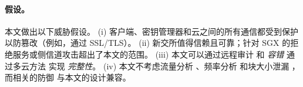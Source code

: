\paragraph*{假设。}
本文做出以下威胁假设。 (i) 客户端、密钥管理器和云之间的所有通信都受到保护以防篡改（例如，通过 SSL/TLS）。 (ii) 新交所值得信赖且可靠；针对 SGX \cite{bulck18, oleksenko18} 的拒绝服务或侧信道攻击超出了本文的范围。 (iii) 本文可以通过远程审计 \cite{ateniese2007provable, juels07} 和 \textit{ 容错} 通过多云方法 \cite{li15} 实现 \textit{ 完整性}。 (iv) 本文不考虑流量分析 \cite{zuo2018mitigating}、频率分析 \cite{li20b} 和块大小泄漏 \cite{ritzdorf16}，而相关的防御 \cite{zuo2018mitigating,li20b,ritzdorf16} 与本文的设计兼容。